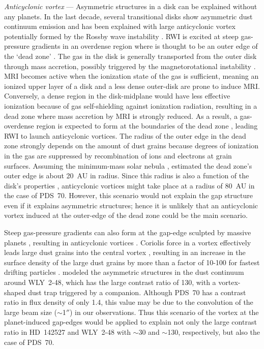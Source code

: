 \documentclass[apj]{emulateapj-rtx4}
\begin{document}
  {\it Anticyclonic vortex} --- 
  Asymmetric structures in a disk can be explained without any planets. In the last decade, 
  several transitional disks show asymmetric dust continuum emission 
  \citep{piet05,brow09,andr11,pere14} and has been explained with large anticyclonic vortex potentially formed 
  by the Rossby wave instability \citep[RWI;][]{love99,rega12}. RWI is excited at steep gas-pressure gradients 
  in an overdense region where is 
  thought to be an outer edge of the `dead zone' \citep{gamm96}. 
  The gas in the disk is generally transported from the outer disk through 
  mass accretion, possibly triggered by the magnetorotational instability \citep[MRI;][]{balb91}. MRI becomes active when the ionization 
  state of the gas is sufficient, meaning an ionized upper layer of a disk and a less dense outer-disk are prone to induce MRI. 
  Conversely, a dense region in 
  the disk-midplane would have less effective ionization because of gas self-shielding against ionization radiation, resulting in a
  dead zone where mass accretion by MRI is strongly reduced. As a result, a gas-overdense region is expected to form at the boundaries of
  the dead zone \citep{varn06,terq08}, leading RWI to launch anticyclonic vortices. The radius of the outer edge in the dead zone 
  strongly depends on the amount of dust grains \citep{sano00} because degrees of ionization in the gas are suppressed by 
  recombination of ions and electrons at grain surfaces. Assuming the minimum-mass solar nebula \citep{haya85}, \citet{sano00} estimated
  the dead zone's outer edge is about 20~AU in radius. Since this radius is also a function of the disk's properties 
  \citep[e.g., a vertical magnetic field, density, and a temperature of a disk;][]{okuz11}, anticyclonic vortices might take place at 
  a radius of 80~AU in the case of PDS~70. However, this scenario would not explain the gap structure even if it explains
  asymmetric structures; 
    hence it is unlikely that an anticyclonic vortex induced at the outer-edge of the dead zone could be the main scenario.

  Steep gas-pressure gradients can also form at the gap-edge sculpted by massive planets \citep{papa07,kley12}, 
  resulting in anticyclonic vortices \citep[e.g.,][]{li05,lin10,zhu14a,zhu14b}.
  Coriolis force in a vortex effectively leads large dust grains into the central 
  vortex \citep[e.g., Fig.~1 in][]{barg95}, resulting in an increase in the surface density of the large dust grains 
  by more than a factor of 10-100 for fastest drifting particles \citep{zhu14a,zhu14b}. 
    \citet{vand13} modeled the asymmetric structures in the dust continuum around WLY~2-48, which has the large contrast ratio of 130, 
    with a vortex-shaped dust trap triggered by a companion. 
    Although PDS~70 has a contrast ratio in flux density of only 1.4,
    this value may be due to the convolution of the large beam size ($\sim$1$''$) in our observations. Thus
    this scenario of the vortex 
    at the planet-induced gap-edges would be applied to explain not only the large contrast ratio in HD~142527 and WLY~2-48 
    with $\sim$30 and $\sim$130, respectively, but also the case of PDS~70.
  
\end{document}
